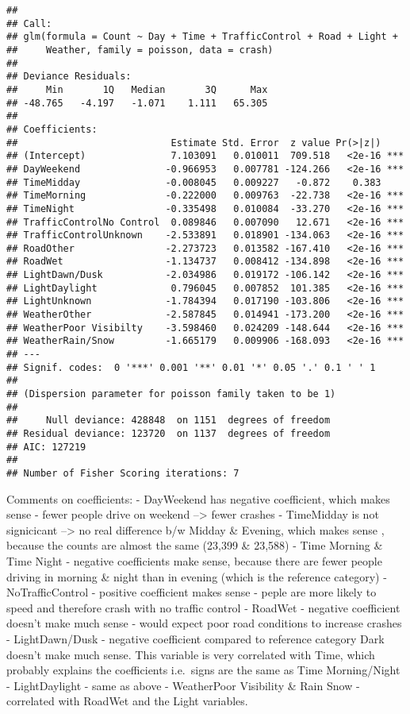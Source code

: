 \documentclass[]{article}
\begin{document}
\begin{verbatim}
## 
## Call:
## glm(formula = Count ~ Day + Time + TrafficControl + Road + Light + 
##     Weather, family = poisson, data = crash)
## 
## Deviance Residuals: 
##     Min       1Q   Median       3Q      Max  
## -48.765   -4.197   -1.071    1.111   65.305  
## 
## Coefficients:
##                           Estimate Std. Error  z value Pr(>|z|)    
## (Intercept)               7.103091   0.010011  709.518   <2e-16 ***
## DayWeekend               -0.966953   0.007781 -124.266   <2e-16 ***
## TimeMidday               -0.008045   0.009227   -0.872    0.383    
## TimeMorning              -0.222000   0.009763  -22.738   <2e-16 ***
## TimeNight                -0.335498   0.010084  -33.270   <2e-16 ***
## TrafficControlNo Control  0.089846   0.007090   12.671   <2e-16 ***
## TrafficControlUnknown    -2.533891   0.018901 -134.063   <2e-16 ***
## RoadOther                -2.273723   0.013582 -167.410   <2e-16 ***
## RoadWet                  -1.134737   0.008412 -134.898   <2e-16 ***
## LightDawn/Dusk           -2.034986   0.019172 -106.142   <2e-16 ***
## LightDaylight             0.796045   0.007852  101.385   <2e-16 ***
## LightUnknown             -1.784394   0.017190 -103.806   <2e-16 ***
## WeatherOther             -2.587845   0.014941 -173.200   <2e-16 ***
## WeatherPoor Visibilty    -3.598460   0.024209 -148.644   <2e-16 ***
## WeatherRain/Snow         -1.665179   0.009906 -168.093   <2e-16 ***
## ---
## Signif. codes:  0 '***' 0.001 '**' 0.01 '*' 0.05 '.' 0.1 ' ' 1
## 
## (Dispersion parameter for poisson family taken to be 1)
## 
##     Null deviance: 428848  on 1151  degrees of freedom
## Residual deviance: 123720  on 1137  degrees of freedom
## AIC: 127219
## 
## Number of Fisher Scoring iterations: 7
\end{verbatim}

Comments on coefficients: - DayWeekend has negative coefficient, which
makes sense - fewer people drive on weekend --\textgreater{} fewer
crashes - TimeMidday is not signicicant --\textgreater{} no real
difference b/w Midday \& Evening, which makes sense , because the counts
are almost the same (23,399 \& 23,588) - Time Morning \& Time Night -
negative coefficients make sense, because there are fewer people driving
in morning \& night than in evening (which is the reference category) -
NoTrafficControl - positive coefficient makes sense - peple are more
likely to speed and therefore crash with no traffic control - RoadWet -
negative coefficient doesn't make much sense - would expect poor road
conditions to increase crashes - LightDawn/Dusk - negative coefficient
compared to reference category Dark doesn't make much sense. This
variable is very correlated with Time, which probably explains the
coefficients i.e.~signs are the same as Time Morning/Night -
LightDaylight - same as above - WeatherPoor Visibility \& Rain Snow -
correlated with RoadWet and the Light variables.
\end{document}
